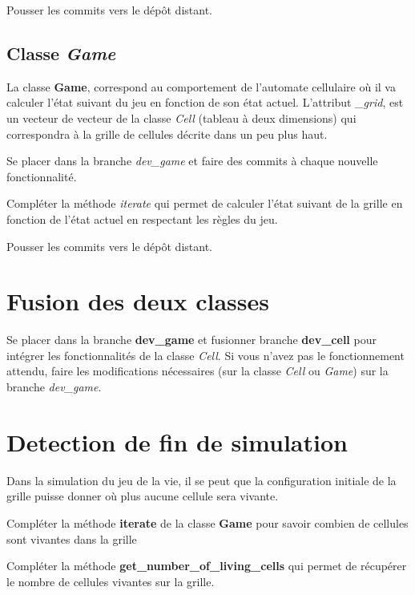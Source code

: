 \medskip

Pousser les commits vers le dépôt distant.

\subsection{Classe \textit{Game}}
La classe \textbf{Game}, correspond au comportement de l'automate cellulaire où il va calculer l'état suivant du jeu en fonction de son état actuel. L'attribut \textit{\_grid}, est un vecteur de vecteur de la classe \textit{Cell} (tableau à deux dimensions) qui correspondra à la grille de cellules décrite dans un peu plus haut.

\medskip

Se placer dans la branche \textit{dev\_game} et faire des commits à chaque nouvelle fonctionnalité.

\medskip

Compléter la méthode \textit{iterate} qui permet de calculer l'état suivant de la grille en fonction de l'état actuel en respectant les règles du jeu.

\medskip

Pousser les commits vers le dépôt distant.

\section{Fusion des deux classes}
Se placer dans la branche \textbf{dev\_game} et fusionner branche \textbf{dev\_cell} pour intégrer les fonctionnalités de la classe \textit{Cell}. Si vous n'avez pas le fonctionnement attendu, faire les modifications nécessaires (sur la classe \textit{Cell} ou \textit{Game}) sur la branche \textit{dev\_game}.


\section{Detection de fin de simulation}
Dans la simulation du jeu de la vie, il se peut que la configuration initiale de la grille puisse donner où plus aucune cellule sera vivante. 

\medskip

Compléter la méthode \textbf{iterate} de la classe \textbf{Game} pour savoir combien de cellules sont vivantes dans la grille

\medskip

Compléter la méthode \textbf{get\_number\_of\_living\_cells} qui permet de récupérer le nombre de cellules vivantes sur la grille.

